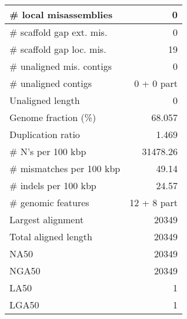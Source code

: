 \documentclass[12pt,a4paper]{article}
\begin{document}
\begin{table}[ht]
\begin{center}
\begin{tabular}{|l*{1}{|r}|}
\# local misassemblies & 0 \\ \hline
\# scaffold gap ext. mis. & 0 \\ \hline
\# scaffold gap loc. mis. & 19 \\ \hline
\# unaligned mis. contigs & 0 \\ \hline
\# unaligned contigs & 0 + 0 part \\ \hline
Unaligned length & 0 \\ \hline
Genome fraction (\%) & 68.057 \\ \hline
Duplication ratio & 1.469 \\ \hline
\# N's per 100 kbp & 31478.26 \\ \hline
\# mismatches per 100 kbp & 49.14 \\ \hline
\# indels per 100 kbp & 24.57 \\ \hline
\# genomic features & 12 + 8 part \\ \hline
Largest alignment & 20349 \\ \hline
Total aligned length & 20349 \\ \hline
NA50 & 20349 \\ \hline
NGA50 & 20349 \\ \hline
LA50 & 1 \\ \hline
LGA50 & 1 \\ \hline
\end{tabular}
\end{center}
\end{table}
\end{document}
